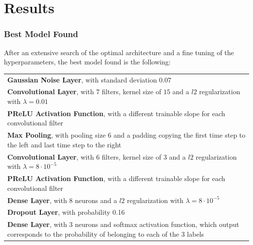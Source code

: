 \documentclass[prl, twocolumn]{revtex4-1}
\begin{document}
\section{Results}

\subsubsection{Best Model Found}

After an extensive search of the optimal architecture and a fine tuning of the hyperparameters, the best model found is the following:

\begin{table}[h]
\begin{tabular}{p{7cm}}
    \textbf{Gaussian Noise Layer}, with standard deviation $0.07$ \\
    \vspace{0pt}
    \textbf{Convolutional Layer}, with 7 filters, kernel size of $15$ and a $l2$ regularization with $\lambda=0.01$ \\
    \vspace{0pt}
    \textbf{PReLU Activation Function}, with a different trainable slope for each convolutional filter \\
    \vspace{0pt}
    \textbf{Max Pooling}, with pooling size 6 and a padding copying the first time step to the left and last time step to the right \\
    \vspace{0pt}
    \textbf{Convolutional Layer}, with 6 filters, kernel size of 3 and a $l2$ regularization with $\lambda=8\cdot10^{-5}$ \\
    \vspace{0pt}
    \textbf{PReLU Activation Function}, with a different trainable slope for each convolutional filter \\
    \vspace{0pt}
    \textbf{Dense Layer}, with 8 neurons and a $l2$ regularization with $\lambda=8\cdot10^{-5}$ \\
    \vspace{0pt}
    \textbf{Dropout Layer}, with probability 0.16 \\
    \vspace{0pt}
    \textbf{Dense Layer}, with 3 neurons and softmax activation function, which output corresponds to the probability of belonging to each of the 3 labels \\
\end{tabular}
\end{table}
\end{document}
